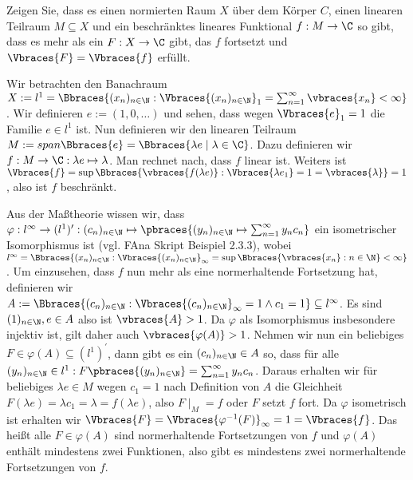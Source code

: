 \begin{exercise}
    Zeigen Sie, dass es einen normierten Raum $X$ über dem Körper $C$, einen linearen Teilraum $M \subseteq X$ und ein beschränktes lineares Funktional $f:M \to \C$ so gibt, dass es mehr als ein $F: X \to \C$ gibt, das $f$ fortsetzt und $\Vbraces{F} = \Vbraces{f}$ erfüllt.
\end{exercise}

\begin{solution}
    Wir betrachten den Banachraum $ X := l^1 = \Bbraces{(x_n)_{n \in \N} : \Vbraces{(x_n)_{n \in \N}}_1 = \sum_{n = 1}^\infty \vbraces{x_n} < \infty}$. Wir definieren $e := (1, 0, \dots)$ und sehen, dass wegen $\Vbraces{e}_1 = 1$ die Familie $e \in l^1$ ist. Nun definieren wir den linearen Teilraum $M := span\Bbraces{e} = \Bbraces{\lambda e \mid \lambda \in \C}$. Dazu definieren wir $f: M \to \C: \lambda e \mapsto \lambda$. Man rechnet nach, dass $f$ linear ist. Weiters ist $\Vbraces{f} = \sup\Bbraces{\vbraces{f(\lambda e)} : \Vbraces{\lambda e_1} = 1 = \vbraces{\lambda} } = 1$, also ist $f$ beschränkt. 

    Aus der Maßtheorie wissen wir, dass $\varphi: l^\infty \to (l^1)^\prime : (c_n)_{n \in \N} \mapsto \pbraces{(y_n)_{n \in \N} \mapsto \sum_{n = 1}^\infty y_n c_n}$ ein isometrischer Isomorphismus ist (vgl. FAna Skript Beispiel 2.3.3), wobei $l^\infty = \Bbraces{(x_n)_{n \in \N}: \Vbraces{(x_n)_{n \in \N}}_\infty = \sup\Bbraces{\vbraces{x_n} : n \in \N} < \infty}$. Um einzusehen, dass $f$ nun mehr als eine normerhaltende Fortsetzung hat, definieren wir \\ $A := \Bbraces{(c_n)_{n \in \N} : \Vbraces{(c_n)_{n \in \N}}_\infty = 1 \land c_1 = 1} \subseteq l^\infty$. Es sind $(1)_{n \in \N}, e \in A$ also ist $\vbraces{A} > 1$. Da $\varphi$ als Isomorphismus insbesondere injektiv ist, gilt daher auch $\vbraces{\varphi(A)} > 1$. Nehmen wir nun ein beliebiges $F \in \varphi(A) \subseteq (l^1)^\prime$, dann gibt es ein $(c_n)_{n \in \N} \in A$ so, dass für alle $(y_n)_{n \in \N} \in l^1: F\pbraces{(y_n)_{n \in \N}} = \sum_{n = 1}^\infty y_n c_n$. Daraus erhalten wir für beliebiges $\lambda e \in M$ wegen $c_1 = 1$ nach Definition von $A$ die Gleichheit $F(\lambda e) = \lambda c_1 = \lambda = f(\lambda e)$, also $F\mid_M = f$ oder $F$ setzt $f$ fort. Da $\varphi$ isometrisch ist erhalten wir $\Vbraces{F} = \Vbraces{\varphi^{-1}(F)}_\infty = 1 = \Vbraces{f}$. Das heißt alle $F \in \varphi(A)$ sind normerhaltende Fortsetzungen von $f$ und $\varphi(A)$ enthält mindestens zwei Funktionen, also gibt es mindestens zwei normerhaltende Fortsetzungen von $f$.
\end{solution}